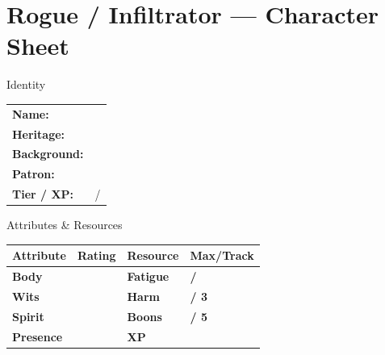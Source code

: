 \documentclass[10pt]{article}
\begin{document}
\newpage

\section*{Rogue / Infiltrator --- Character Sheet}

\begin{minipage}[t]{0.48\linewidth}
    \begin{charbox}{Identity}
        \begin{tabular}{p{2.5cm} p{5cm}}
            \textbf{Name:} & \underline{\hspace{4cm}} \\
            \textbf{Heritage:} & \underline{\hspace{4cm}} \\
            \textbf{Background:} & \underline{\hspace{4cm}} \\
            \textbf{Patron:} & \underline{\hspace{4cm}} \\
            \textbf{Tier / XP:} & \underline{\hspace{2cm}} / \underline{\hspace{2cm}} \\
        \end{tabular}
    \end{charbox}
    
    \vspace{0.5em}
    
    \begin{charbox}{Attributes \& Resources}
        \begin{tabular}{>{\bfseries}p{2.5cm} >{\bfseries}p{1.5cm} >{\bfseries}p{2.5cm} >{\bfseries}p{1.5cm}}
            \toprule
            \textbf{Attribute} & \textbf{Rating} & \textbf{Resource} & \textbf{Max/Track} \\
            \midrule
            Body & \underline{\hspace{1.5cm}} & Fatigue & \underline{\hspace{1.5cm}} / \underline{\hspace{1.5cm}} \\
            Wits & \underline{\hspace{1.5cm}} & Harm & \underline{\hspace{1.5cm}} / 3 \\
            Spirit & \underline{\hspace{1.5cm}} & Boons & \underline{\hspace{1.5cm}} / 5 \\
            Presence & \underline{\hspace{1.5cm}} & XP & \underline{\hspace{1.5cm}} \\
            \bottomrule
        \end{tabular}
    \end{charbox}
    

\end{minipage}
\end{document}
